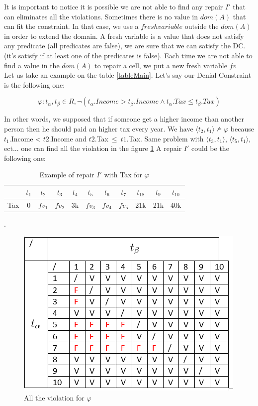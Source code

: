 \documentclass[letterpaper, 12pt]{report}
\theoremstyle{definition}
\begin{document}
It is important to notice it is possible we are not able to find any repair $I'$ that can eliminates all the violations. Sometimes there is no value in $dom(A)$ that can fit the constraint. In that case, we use a $fresh variable$ outside the $dom(A)$ in order to extend the domain. A fresh variable is a value that does not satisfy any predicate (all predicates are false), we are sure that we can satisfy the DC. (it's satisfy if at least one of the predicates is false). Each time we are not able to find a value in the $dom(A)$  to repair a cell, we put a new fresh variable $fv$\\

Let us take an example on the table \ref{tableMain}. Let's say our Denial Constraint is the following one:

$$ \varphi : t_\alpha,t_\beta \in R, \neg(t_\alpha.Income > t_\beta.Income \wedge t_\alpha.Tax \leq t_\beta.Tax)$$

In other words, we supposed that if someone get a higher income than another person then he should paid an higher tax every year. We have $ \langle t_2,t_1 \rangle \not\models \varphi $ because $t_1$.Income < $t2.$Income and $t2$.Tax$\ \leq\ t1$.Tax. Same problem with $ \langle t_3,t_1 \rangle$, $ \langle t_5,t_1 \rangle$, ect... one can find all the violation in the figure \ref{BadTax} A repair $I'$ could be the following one:

\begin{table}[H]
	\centering
	\begin{tabular}{|c|c c c c c c c c c c|}
	\hline
	   & $t_1$ & $t_2$ & $t_3$ &$t_4$ &$t_5$ &$t_6$ &$t_7$ &$t_18$ &$t_9$ &$t_10$ \\
	\hline
	 Tax & 0 & \color{red} $fv_1$ & \color{red} $fv_2$& 3k & \color{orange}$fv_3$& \color{orange} $fv_4$& \color{orange} $fv_5$& 21k & 21k & 40k\\
	 \hline
	\end{tabular}
	\caption{\label{tableExample} Example of repair $I'$ with Tax for $\varphi$}.
\end{table}


\begin{figure}
	\centering
	\includegraphics[scale=1]{img/TaxBad}
	\caption{\label{BadTax} All the violation for $\varphi$}
\end{figure}
\end{document}
